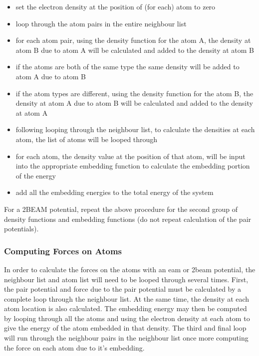\begin{itemize}
\item set the electron density at the position of (for each) atom to zero
\item loop through the atom pairs in the entire neighbour list
\item for each atom pair, using the density function for the atom A, the density at atom B due to atom A will be calculated and added to the density at atom B
\item if the atoms are both of the same type the same density will be added to atom A due to atom B
\item if the atom types are different, using the density function for the atom B, the density at atom A due to atom B will be calculated and added to the density at atom A
\item following looping through the neighbour list, to calculate the densities at each atom, the list of atoms will be looped through
\item for each atom, the density value at the position of that atom, will be input into the appropriate embedding function to calculate the embedding portion of the energy
\item add all the embedding energies to the total energy of the system
\end{itemize}

For a 2BEAM potential, repeat the above procedure for the second group of density functions and embedding functions (do not repeat calculation of the pair potentials).


\subsubsection{Computing Forces on Atoms}

In order to calculate the forces on the atoms with an \acrshort{eam} or \acrshort{2beam} potential, the neighbour list and atom list will need to be looped through several times.  First, the pair potential and force due to the pair potential must be calculated by a complete loop through the neighbour list.  At the same time, the density at each atom location is also calculated.  The embedding energy may then be computed by looping through all the atoms and using the electron density at each atom to give the energy of the atom embedded in that density.  The third and final loop will run through the neighbour pairs in the neighbour list once more computing the force on each atom due to it's embedding.

